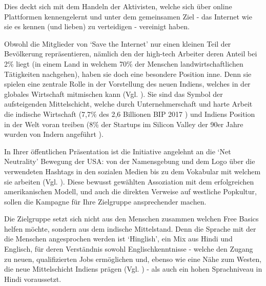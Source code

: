 \documentclass{article}
\begin{document}
Dies deckt sich mit dem Handeln der Aktivisten, welche sich über online Plattformen kennengelernt und unter dem gemeinsamen Ziel - das Internet wie sie es kennen (und lieben) zu verteidigen - vereinigt haben.

\medskip

Obwohl die Mitglieder von `Save the Internet' nur einen kleinen Teil der Bevölkerung repräsentieren, nämlich den der high-tech Arbeiter deren Anteil bei 2\% liegt (in einem Land in welchem 70\% der Menschen landwirtschaftlichen Tätigkeiten nachgehen), haben sie doch eine besondere Position inne. Denn sie spielen eine zentrale Rolle in der Vorstellung des neuen Indiens, welches in der globales Wirtschaft mitmischen kann (Vgl. \cite{thomas2012}).
Sie sind das Symbol der aufsteigenden Mittelschicht, welche durch Unternehmerschaft und harte Arbeit die indische Wirtschaft (7,7\% des 2,6 Billionen BIP 2017 \autocite{statistaIndiaGDP}\autocite{imfIndiaGDP}) und Indiens Position in der Welt voran treiben (8\% der Startups im Silicon Valley der 90er Jahre wurden von Indern angeführt \parencite{upadhya2004}).

\medskip

In Ihrer öffentlichen Präsentation ist die Initiative angelehnt an die `Net Neutrality' Bewegung der USA: von der Namensgebung und dem Logo über die verwendeten Hashtags in den sozialen Medien bis zu dem Vokabular mit welchem sie arbeiten (Vgl. \cite{prasad2017}).
Diese bewusst gewählten Assoziation mit dem erfolgreichen amerikanischen Modell, und auch die direkten Verweise auf westliche Popkultur, sollen die Kampagne für Ihre Zielgruppe ansprechender machen.

Die Zielgruppe setzt sich nicht aus den Menschen zusammen welchen Free Basics helfen möchte, sondern aus dem indische Mittelstand. Denn die Sprache mit der die Menschen angesprochen werden ist `Hinglish', ein Mix aus Hindi und Englisch, für deren Verständnis sowohl Englischkenntnisse - welche den Zugang zu neuen, qualifizierten Jobs ermöglichen und, ebenso wie eine Nähe zum Westen, die neue Mittelschicht Indiens prägen (Vgl. \cite{fernandes2006}) - als auch ein hohen Sprachniveau in Hindi voraussetzt.

\medskip
\end{document}
